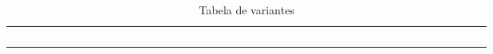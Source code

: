 \begin{table}
	\caption{Tabela de variantes}
	\label{table:variants}
	\begin{center}
		\begin{tabular}{c|c|c|c|c|c|c|c|c}
			\rowcolor{header}
			\textcolor{white}{Crom.} & \textcolor{white}{Posição} & \textcolor{white}{SNP Id} & \textcolor{white}{Alelo ref.} & \textcolor{white}{Alelo alt.} & \textcolor{white}{Freq.} & \textcolor{white}{Gene} & \textcolor{white}{Tipo de mutação} & \textcolor{white}{Significado}\\
			
		\end{tabular}
	\end{center}
\end{table}

